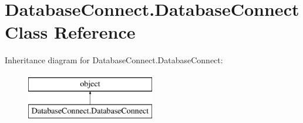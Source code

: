\hypertarget{classDatabaseConnect_1_1DatabaseConnect}{}\section{Database\+Connect.\+Database\+Connect Class Reference}
\label{classDatabaseConnect_1_1DatabaseConnect}
Inheritance diagram for Database\+Connect.\+Database\+Connect\+:\begin{figure}[H]
\begin{center}
\leavevmode
\includegraphics[height=2.000000cm]{classDatabaseConnect_1_1DatabaseConnect}
\end{center}
\end{figure}
